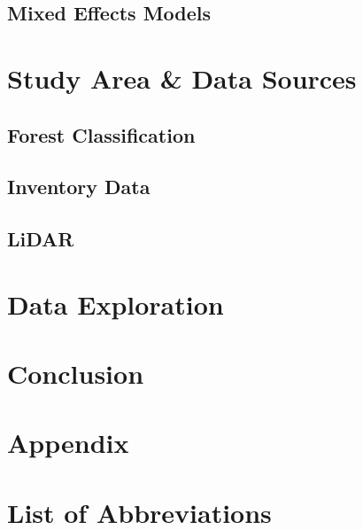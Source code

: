 \documentclass[12pt]{article}
\numberwithin{equation}{section}
\numberwithin{table}{section}
\numberwithin{figure}{section}
\begin{document}
\subsection{Mixed Effects Models} \label{mixed_models}

%



\clearpage

\section{Study Area \& Data Sources}
\subsection{Forest Classification}

\subsection{Inventory Data} \label{Inventory Data}

\subsection{LiDAR} \label{LiDAR}

\clearpage


\section{Data Exploration} \label{Data Exploration}

\clearpage

\section{Conclusion} 

\clearpage



\section*{Appendix} \label{Appendix}


\clearpage



\listoffigures


\clearpage

\listoftables


\clearpage

\section*{List of Abbreviations}




\clearpage


\nocite{*}

\end{document}
